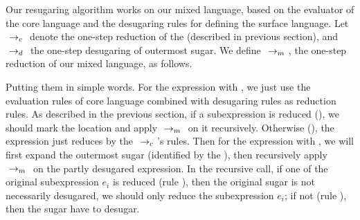 Our resugaring algorithm works on our mixed language, based on the evaluator of the core language and the desugaring rules for defining the surface language. Let $~\rightarrow_c~$ denote the one-step reduction of the  (described in previous section), and $~\rightarrow_d~$ the one-step desugaring of outermost sugar. We define $~\rightarrow_m~$, the one-step reduction of our mixed language, as follows.
\label{mark:mixedreduction}
{}
{}
{}
{
}

Putting them in simple words. For the expression with , we just use the evaluation rules of core language combined with desugaring rules as reduction rules. As described in the previous section, if a  subexpression is reduced (), we should mark the location and apply $~\rightarrow_m~$ on it recursively. Otherwise (), the expression just reduces by the $~\rightarrow_c~$'s rules.
Then for the expression with , we will first expand the outermost sugar (identified by the ), then recursively apply $~\rightarrow_m~$ on the partly desugared expression. In the recursive call, if one of the original subexpression $e_i$ is reduced (rule ), then the original sugar is not necessarily desugared, we should only reduce the subexpression $e_i$; if not (rule ), then the sugar have to desugar.



